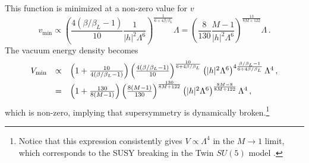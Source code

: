 \documentclass[a4paper,12pt]{article}
\begin{document}
{\begin{equation}
\end{equation}
This function is minimized at a non-zero value for $v$
\begin{equation}
	v_\text{min} \propto \left(\frac{4(\beta/\beta_{L} - 1) }{10}\frac{1 }{\vert h \vert^2 \Lambda^6} \right)^{\frac{1}{6+4\beta/\beta_{L}}} \Lambda  = \left( \frac{8}{130}\frac{M-1 }{\vert h \vert^2 \Lambda^6} \right)^{\frac{13}{8M + 122}} \Lambda  \, .
\end{equation}
The vacuum energy density becomes
\begin{equation}
	\begin{array}{rcl}
		V_\text{min} &\propto& \left(1 + \frac{10}{4(\beta/\beta_L -1)} \right)\left(\frac{4(\beta/\beta_L - 1)}{10} \right)^{\frac{10}{6+4\beta/\beta_L}} \left(\vert h \vert^2 \Lambda^6\right)^{4\frac{\beta/\beta_L -1}{6+4\beta/\beta_L}} \Lambda^4 \, , \vspace{0.1cm}\\
		&=& \left(1 + \frac{130}{8(M -1)} \right)\left(\frac{8(M - 1)}{130} \right)^{\frac{130}{8M+122}} \left(\vert h \vert^2 \Lambda^6\right)^{\frac{8M-8}{8M+122}} \Lambda^4 \, ,
	\end{array}
\end{equation}
which is non-zero, implying that supersymmetry is dynamically broken.\footnote{Notice that this expression consistently gives $V\propto \Lambda^4$ in the $M\to 1$ limit, which corresponds to the SUSY breaking in the Twin $SU(5)$ model \cite{Argurio:2020dkg}.}


}
\end{document}
